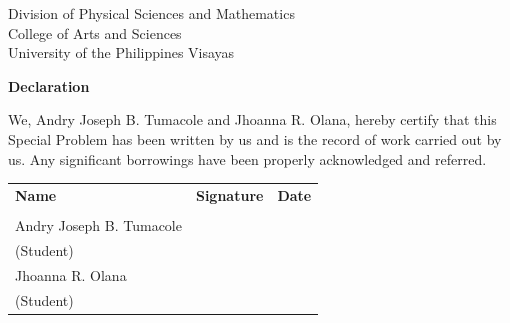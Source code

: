 \begin{center}
	Division of Physical Sciences and Mathematics\\
	College of Arts and Sciences\\
	University of the Philippines Visayas 
	
		\textbf{Declaration}
		\end{center}

We, Andry Joseph B. Tumacole and Jhoanna R. Olana, hereby certify that this Special Problem has been written by us  and is the record of work carried out by us. Any significant borrowings have been properly acknowledged and referred.

	\begin{tabular}{lll}
	\bfseries Name  & \bfseries Signature & \bfseries Date\\ \\
	Andry Joseph B. Tumacole &\signaturerule  & \signaturerule\\ 
	\multicolumn{1}{l}{(Student)} \\ 
	Jhoanna R. Olana &\signaturerule  & \signaturerule\\ 
	\multicolumn{1}{l}{(Student)} \\

\end{tabular}




